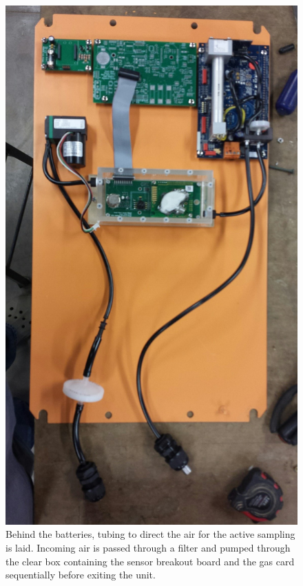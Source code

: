 \documentclass[numbook, envcountsect, envcountsame, envcountreset, runningheads, twocolumn]{svjour3}
\begin{document}
		\begin{figure}
				\centering
				\includegraphics[width=\columnwidth,keepaspectratio]{commbuild2.jpg}
				\caption[Layout of board in communication nodes]{Behind the batteries, tubing to direct the air for the active sampling is laid.  Incoming air is passed through a filter and pumped through the clear box containing the sensor breakout board and the gas card sequentially before exiting the unit.\label{fig:commbuild2}}
		\end{figure}	
		
\end{document}
